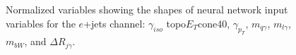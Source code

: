 \begin{figure}[h!]
\vspace{-4.5mm}
\hfil
{}
\caption{Normalized variables showing the shapes of neural network input variables for the $e$+jets channel: $\gamma_{iso}$ topo$E_{T}$cone40, $\gamma_{p_T}$, $m_{q \gamma}$, $m_{l \gamma}$, $m_{bW}$, and $\Delta R_{j\gamma}$.}
\label{fig:VarPlotsej1}
\end{figure}

